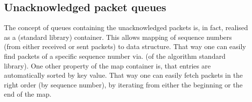 \subsection{Unacknowledged packet queues}
The concept of queues containing the unacknowledged packets is, in fact, realised as a  (standard library) container. This allows mapping of sequence numbers (from either received or sent packets) to  data structure. That way one can easily find packets of a specific sequence number via.  (of the algorithm standard library). One other property of the map container is, that entries are automatically sorted by key value. That way one can easily fetch packets in the right order (by sequence number), by iterating from either the beginning or the end of the map.
